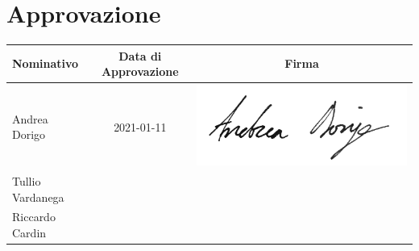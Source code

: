 {\section{Approvazione}\label{OrganigrammaApprovazione}
\quad
\def\tabularxcolumn#1{m{#1}}
{	
	\begin{center}
		\renewcommand{\arraystretch}{1.4}
		\begin{tabularx}{\textwidth}{|X|c|c|}
			\hline
			\rowcolor{airforceblue}
			\textbf{Nominativo} & \textbf{Data di Approvazione} & \textbf{Firma}\\
			\hline
			Andrea Dorigo & 2021-01-11 & \includegraphics[width=0.2\linewidth]{../immagini/firme/firma_andrea_dorigo.png}\\
			\hline
			Tullio Vardanega & &\\
			Riccardo Cardin & &\\
			\hline
		\end{tabularx}
	\end{center}
\clearpage
}}
